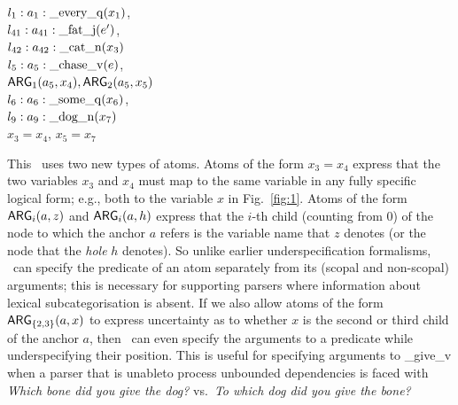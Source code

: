 \begin{examples}
\item 
$l_1:a_1:\mathrm{\_every\_q}(x_1)$, \\
$l_{41}:a_{41}:\mathrm{\_fat\_j}(e')$,\\
$l_{42}:a_{42}:\mathrm{\_cat\_n}(x_3)$\\
$l_5:a_5:\mathrm{\_chase\_v}(e)$, \\
\hspace*{0.1in} $\mathsf{ARG}_1(a_5,x_4),
\mathsf{ARG}_2(a_5,x_5)$\\ 
$l_6:a_6:\mathrm{\_some\_q}(x_6)$, \\
$l_9:a_9:\mathrm{\_dog\_n}(x_7)$\\
$x_3=x_4$, $x_5=x_7$
\label{ex:cat-partial-parser}
\end{examples}

This \rmrs\ uses two new types of atoms.  Atoms of the form $x_3=x_4$
express that the two variables $x_3$ and $x_4$ must map to the same
variable in any fully specific logical form; e.g., both to the
variable $x$ in Fig.~\ref{fig:1}.  Atoms of the form $\mathsf{ARG}_i(a,z)$ and
$\mathsf{ARG}_i(a,h)$ express that the $i$-th child (counting from 0) of the
node to which the anchor $a$ refers is the variable name that $z$
denotes (or the node that the {\em hole} $h$ denotes).  So unlike
earlier underspecification formalisms, \rmrs\ can specify the
predicate of an atom separately from its (scopal and non-scopal)
arguments; this is necessary for supporting parsers where information
about lexical subcategorisation is absent. If we also allow atoms of
the form $\mathsf{ARG}_{\{2,3\}}(a,x)$ to express uncertainty as to whether
$x$ is the second or third child of the anchor $a$, then \rmrs\ can
even specify the arguments to a predicate while underspecifying their
position.  This is useful for specifying arguments to \_give\_v when a
parser that is unableto process unbounded dependencies is faced with
{\em Which bone did you give the dog?} vs.\ {\em To which dog did you
  give the bone?}

